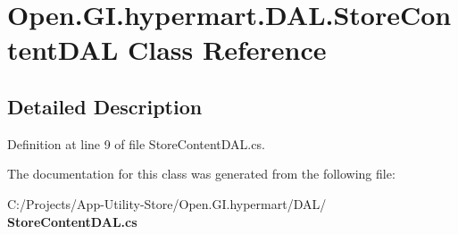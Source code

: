 \section{Open.\+G\+I.\+hypermart.\+D\+A\+L.\+Store\+Content\+D\+AL Class Reference}
\label{class_open_1_1_g_i_1_1hypermart_1_1_d_a_l_1_1_store_content_d_a_l}


\subsection{Detailed Description}


Definition at line 9 of file Store\+Content\+D\+A\+L.\+cs.



The documentation for this class was generated from the following file\+:\begin{DoxyCompactItemize}
\item 
C\+:/\+Projects/\+App-\/\+Utility-\/\+Store/\+Open.\+G\+I.\+hypermart/\+D\+A\+L/\textbf{ Store\+Content\+D\+A\+L.\+cs}\end{DoxyCompactItemize}
